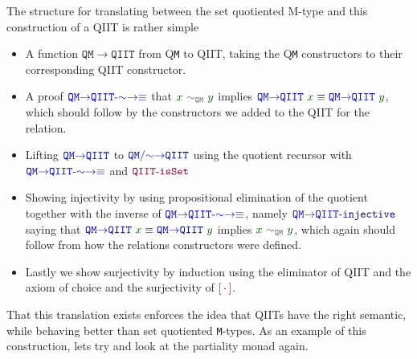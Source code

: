 \documentclass[twoside,11pt,openright]{report}
\theoremstyle{plain} %
\theoremstyle{definition}
\theoremstyle{remark}
\newcommand*{\term}[1]{\textcolor{green!30!black}{#1}} %
\newcommand*{\relation}[1]{\textcolor{gray!75!black}{\ensuremath{\mathtt{#1}}}}
\newcommand*{\function}[1]{\textcolor{blue!60!black}{\ensuremath{\mathtt{#1}}}}
\newcommand*{\constructor}[1]{\textcolor{purple!60!black}{\ensuremath{\mathtt{#1}}}}
\newcommand*{\quotientconstructor}[1]{\constructor{[}\,#1\,\constructor{]}}
\begin{document}
The structure for translating between the set quotiented M-type and this construction of a QIIT is rather simple
\begin{itemize}
\item A function \function{QM{\rightarrow}QIIT} from Q\texttt{M} to QIIT, taking the Q\texttt{M} constructors to their corresponding QIIT constructor.
\item A proof \(\function{QM{\rightarrow}QIIT\text{-}{\sim}{\rightarrow}{\equiv}}\) that \(\term{x}~\relation{\sim_{QM}}~\term{y}\) implies \(\function{QM{\rightarrow}QIIT}~\term{x} \equiv \function{QM{\rightarrow}QIIT}~\term{y}\), which should follow by the constructors we added to the QIIT for the relation.
\item Lifting \(\function{QM{\rightarrow}QIIT}\) to \(\function{QM/{\sim}{\rightarrow}QIIT}\) using the quotient recursor with \(\function{QM{\rightarrow}QIIT\text{-}{\sim}{\rightarrow}{\equiv}}\) and \(\constructor{QIIT\text{-}isSet}\)
\item Showing injectivity by using propositional elimination of the quotient together with the inverse of \(\function{QM{\rightarrow}QIIT\text{-}{\sim}{\rightarrow}{\equiv}}\), namely \(\function{QM{\rightarrow}QIIT\text{-}injective}\) saying that \(\function{QM{\rightarrow}QIIT}~\term{x} \equiv \function{QM{\rightarrow}QIIT}~\term{y}\) implies \(\term{x}~\relation{\sim_{QM}}~\term{y}\), which again should follow from how the relations constructors were defined.
\item Lastly we show surjectivity by induction using the eliminator of QIIT and the axiom of choice and the surjectivity of \(\quotientconstructor{{\cdot}}\).
\end{itemize}
That this translation exists enforces the idea that QIITs have the right semantic, while behaving better than set quotiented \texttt{M}-types. As an example of this construction, lets try and look at the partiality monad again.
\end{document}
